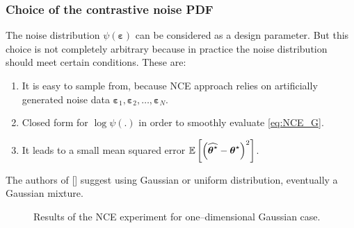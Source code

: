 \subsubsection{Choice of the contrastive noise PDF}
The noise distribution $\psi\left(\boldsymbol{\varepsilon}\right)$ can be considered as a design parameter. But this choice is not completely arbitrary because in practice the noise distribution should meet certain conditions. These are:
\begin{enumerate}
    \item It is easy to sample from, because NCE approach relies on artificially generated noise data $\boldsymbol{\varepsilon}_1,\boldsymbol{\varepsilon}_2,\dots,\boldsymbol{\varepsilon}_N$. 
    \item Closed form for $\log\psi\left(. \right)$ in order to smoothly evaluate \eqref{eq:NCE_G}.
    \item It leads to a small mean squared error $\mathbb{E}\left[\left(\widehat{\boldsymbol{\theta}^\star} - \boldsymbol{\theta}^\star\right)^2\right]$.
\end{enumerate}
The authors of [] suggest using Gaussian or uniform distribution, eventually a Gaussian mixture. 
\begin{example}
\begin{figure}[h]
	\centering
	\caption{Results of the NCE experiment for one--dimensional Gaussian case.}%
	\label{ex:NCE_1}%
\end{figure}
\end{example}

